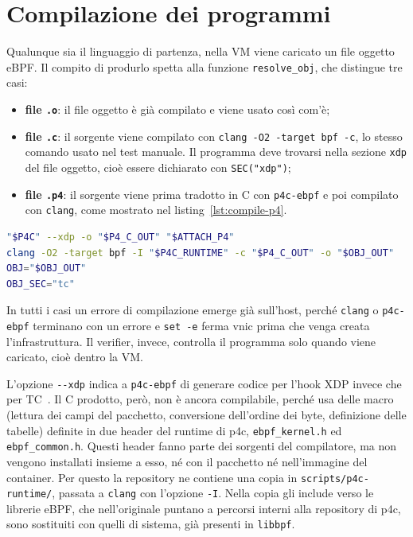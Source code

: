\section{Compilazione dei programmi}\label{sec:compilazione}

Qualunque sia il linguaggio di partenza, nella VM viene caricato un file oggetto eBPF. Il compito di produrlo spetta alla funzione \texttt{resolve\_obj}, che distingue tre casi:
\begin{itemize}
    \item \textbf{file \texttt{.o}}: il file oggetto è già compilato e viene usato così com'è;
    \item \textbf{file \texttt{.c}}: il sorgente viene compilato con \texttt{clang -O2 -target bpf -c}, lo stesso comando usato nel test manuale. Il programma deve trovarsi nella sezione \texttt{xdp} del file oggetto, cioè essere dichiarato con \texttt{SEC("xdp")};
    \item \textbf{file \texttt{.p4}}: il sorgente viene prima tradotto in C con \texttt{p4c-ebpf} e poi compilato con \texttt{clang}, come mostrato nel listing~\ref{lst:compile-p4}.
\end{itemize}

\begin{lstlisting}[language=bash, basicstyle=\ttfamily\scriptsize, caption={Traduzione e compilazione di un programma P4 in \texttt{vnic.sh}}, label={lst:compile-p4}]
"$P4C" --xdp -o "$P4_C_OUT" "$ATTACH_P4"
clang -O2 -target bpf -I "$P4C_RUNTIME" -c "$P4_C_OUT" -o "$OBJ_OUT"
OBJ="$OBJ_OUT"
OBJ_SEC="tc"
\end{lstlisting}

In tutti i casi un errore di compilazione emerge già sull'host, perché \texttt{clang} o \texttt{p4c-ebpf} terminano con un errore e \texttt{set -e} ferma vnic prima che venga creata l'infrastruttura. Il verifier, invece, controlla il programma solo quando viene caricato, cioè dentro la VM.

L'opzione \texttt{-{}-xdp} indica a \texttt{p4c-ebpf} di generare codice per l'hook XDP invece che per TC~\cite{p4c-ebpf}. Il C prodotto, però, non è ancora compilabile, perché usa delle macro (lettura dei campi del pacchetto, conversione dell'ordine dei byte, definizione delle tabelle) definite in due header del runtime di p4c, \texttt{ebpf\_kernel.h} ed \texttt{ebpf\_common.h}. Questi header fanno parte dei sorgenti del compilatore, ma non vengono installati insieme a esso, né con il pacchetto né nell'immagine del container. Per questo la repository ne contiene una copia in \texttt{scripts/p4c-runtime/}, passata a \texttt{clang} con l'opzione \texttt{-I}. Nella copia gli include verso le librerie eBPF, che nell'originale puntano a percorsi interni alla repository di p4c, sono sostituiti con quelli di sistema, già presenti in \texttt{libbpf}.

